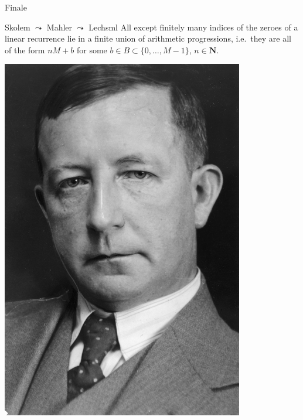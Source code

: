 \documentclass[notheorems]{beamer}
\theoremstyle{plain}
\newcommand{\NN}{\mathbf{N}}
\begin{document}
\begin{frame}{Finale}
    \begin{theorem}{Skolem \(\leadsto\) Mahler \(\leadsto\) Lech}{sml}
All except finitely many indices of the zeroes of a linear recurrence lie in a finite union of arithmetic progressions, i.e.\ they are all of the form \(nM + b\) for some \(b \in B \subset \{0, \ldots, M-1\}\), \(n \in \NN\).%
\end{theorem}
\pause
\includegraphics[height = 0.6\textheight]{skolem.jpeg}
\end{frame}
\end{document}
